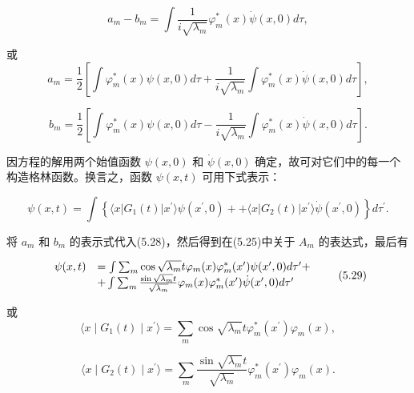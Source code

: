 \begin{equation*}
a _ {m} - b _ {m} = \int \frac {1}{i \sqrt {\lambda_ {m}}} \varphi_ {m} ^ {*} (x) \dot {\psi} (x, 0) d \tau ,
\end{equation*}

或
\begin{equation*}
a _ {m} = \frac {1}{2} \left[ \int \varphi_ {m} ^ {*} (x) \psi (x, 0) d \tau + \frac {1}{i \sqrt {\lambda_ {m}}} \int \varphi_ {m} ^ {*} (x) \dot {\psi} (x, 0) d \tau \right],
\end{equation*}

\begin{equation*}
b _ {m} = \frac {1}{2} \left[ \int \varphi_ {m} ^ {*} (x) \psi (x, 0) d \tau - \frac {1}{i \sqrt {\lambda_ {m}}} \int \varphi_ {m} ^ {*} (x) \dot {\psi} (x, 0) d \tau \right].
\end{equation*}

因方程的解用两个始值函数 $\psi(x,0)$ 和 $\dot {\psi} (x,0)$ 确定，故可对它们中的每一个构造格林函数。换言之，函数 $\psi(x,t)$ 可用下式表示：

\begin{equation*}
\psi (x, t) = \int \left\{\langle x | G _ {1} (t) | x ^ {\prime} \rangle \psi (x ^ {\prime}, 0) + \right.   \left. + \langle x | G _ {2} (t) | x ^ {\prime} \rangle \dot {\psi} (x ^ {\prime}, 0) \right\} d \tau^ {\prime}.
\end{equation*}

将 $a_{m}$ 和 $b_{m}$ 的表示式代入(5.28)，然后得到在(5.25)中关于 $A_{m}$ 的表达式，最后有

\begin{equation*}
\begin{array}{r l} \psi (x, t) & = \int \sum_ {m} \cos \sqrt {\lambda_ {m}} t \varphi_ {m} (x) \varphi_ {m} ^ {*} (x ^ {\prime}) \psi (x ^ {\prime}, 0) d \tau^ {\prime} + \\ & + \int \sum_ {m} \frac {\sin \sqrt {\lambda_ {m}} t}{\sqrt {\lambda_ {m}}} \varphi_ {m} (x) \varphi_ {m} ^ {*} (x ^ {\prime}) \dot {\psi} (x ^ {\prime}, 0) d \tau^ {\prime} \end{array}\tag{5.29}
\end{equation*}

或
\begin{equation*}
\langle x \mid G _ {1} (t) \mid x ^ {\prime} \rangle = \sum_ {m} \cos \sqrt {\lambda_ {m}} t \varphi_ {m} ^ {*} (x ^ {\prime}) \varphi_ {m} (x),\tag{5.30a}
\end{equation*}

\begin{equation*}
\langle x \mid G _ {2} (t) \mid x ^ {\prime} \rangle = \sum_ {m} \frac {\sin \sqrt {\lambda_ {m}} t}{\sqrt {\lambda_ {m}}} \varphi_ {m} ^ {*} \left(x ^ {\prime}\right) \varphi_ {m} (x).\tag{5.30b}
\end{equation*}

